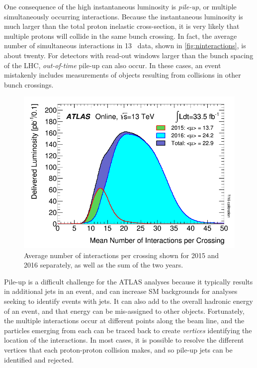 One consequence of the high instantaneous luminosity is \textit{pile-up}, or multiple simultaneously occurring interactions. Because the instantaneous luminosity is much larger than the total proton inelastic cross-section, it is very likely that multiple protons will collide in the same bunch crossing. In fact, the average number of simultaneous interactions in 13 \tev~data, shown in \autoref{fig:ninteractions}, is about twenty. For detectors with read-out windows larger than the bunch spacing of the \ac{LHC}, \textit{out-of-time} pile-up can also occur. In these cases, an event mistakenly includes measurements of objects resulting from collisions in other bunch crossings. 

\begin{centering}
\begin{figure}[!hbt]
\myfloatalign
\includegraphics[width=.85\linewidth]{figures/lhc/mu_2015_2016_LHCC.png}
\caption{Average number of interactions per crossing shown for 2015 and 2016 separately, as well as the sum of the two years.}
\label{fig:ninteractions}
\end{figure}
\end{centering}

Pile-up is a difficult challenge for the \ac{ATLAS} analyses because it typically results in additional jets in an event, and can increase \ac{SM} backgrounds for analyses seeking to identify events with jets. It can also add to the overall hadronic energy of an event, and that energy can be mis-assigned to other objects. Fortunately, the multiple interactions occur at different points along the beam line, and the particles emerging from each can be traced back to create \textit{vertices} identifying the location of the interactions. In most cases, it is possible to resolve the different vertices that each proton-proton collision makes, and so pile-up jets can be identified and rejected. 


